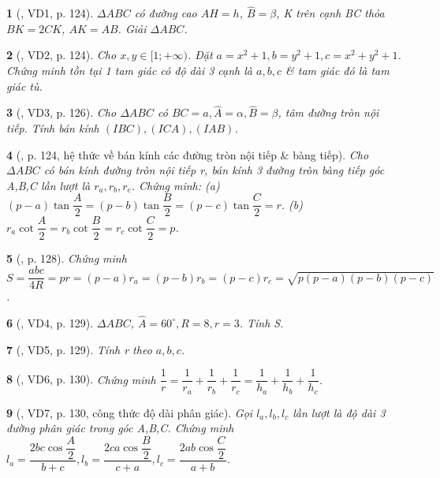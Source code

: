 \documentclass{article}
\newtheorem{baitoan}{}
\begin{document}
\begin{baitoan}[\cite{TLCT_hinh_hoc_10}, VD1, p. 124]
	$\Delta ABC$ có đường cao $AH = h$, $\widehat{B} = \beta$, K trên cạnh BC thỏa $BK = 2CK$, $AK = AB$. Giải $\Delta ABC$.
\end{baitoan}

\begin{baitoan}[\cite{TLCT_hinh_hoc_10}, VD2, p. 124]
	Cho $x,y\in[1;+\infty)$. Đặt $a = x^2 + 1,b = y^2 + 1,c = x^2 + y^2 + 1$. Chứng minh tồn tại 1 tam giác có độ dài 3 cạnh là $a,b,c$ \& tam giác đó là tam giác tù.
\end{baitoan}

\begin{baitoan}[\cite{TLCT_hinh_hoc_10}, VD3, p. 126]
	Cho $\Delta ABC$ có $BC = a,\widehat{A} = \alpha,\widehat{B} = \beta$, tâm đường tròn nội tiếp. Tính bán kính $(IBC),(ICA),(IAB)$.
\end{baitoan}

\begin{baitoan}[\cite{TLCT_hinh_hoc_10}, p. 124, hệ thức về bán kính các đường tròn nội tiếp \& bàng tiếp]
	Cho $\Delta ABC$ có bán kính đường tròn nội tiếp r, bán kính 3 đường tròn bàng tiếp góc A,B,C lần lượt là $r_a,r_b,r_c$. Chứng minh: (a) $(p - a)\tan\dfrac{A}{2} = (p - b)\tan\dfrac{B}{2} = (p - c)\tan\dfrac{C}{2} = r$. (b) $r_a\cot\dfrac{A}{2} = r_b\cot\dfrac{B}{2} = r_c\cot\dfrac{C}{2} = p$.
\end{baitoan}

\begin{baitoan}[\cite{TLCT_hinh_hoc_10}, p. 128]
	Chứng minh $S = \dfrac{abc}{4R} = pr = (p - a)r_a = (p - b)r_b = (p - c)r_c = \sqrt{p(p - a)(p - b)(p - c)}$.
\end{baitoan}

\begin{baitoan}[\cite{TLCT_hinh_hoc_10}, VD4, p. 129]
	$\Delta ABC$, $\widehat{A} = 60^\circ,R = 8,r = 3$. Tính S.
\end{baitoan}

\begin{baitoan}[\cite{TLCT_hinh_hoc_10}, VD5, p. 129]
	Tính r theo $a,b,c$.
\end{baitoan}

\begin{baitoan}[\cite{TLCT_hinh_hoc_10}, VD6, p. 130]
	Chứng minh $\dfrac{1}{r} = \dfrac{1}{r_a} + \dfrac{1}{r_b} + \dfrac{1}{r_c} = \dfrac{1}{h_a} + \dfrac{1}{h_b} + \dfrac{1}{h_c}$.
\end{baitoan}

\begin{baitoan}[\cite{TLCT_hinh_hoc_10}, VD7, p. 130, công thức độ dài phân giác]
	Gọi $l_a,l_b,l_c$ lần lượt là độ dài 3 đường phân giác trong góc A,B,C. Chứng minh $l_a = \dfrac{2bc\cos\dfrac{A}{2}}{b + c},l_b = \dfrac{2ca\cos\dfrac{B}{2}}{c + a},l_c = \dfrac{2ab\cos\dfrac{C}{2}}{a + b}$.
\end{baitoan}
\end{document}
